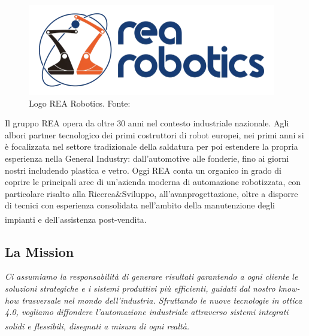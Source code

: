 \begin{figure} [ht]
    \centering
    \includegraphics[width=0.5\linewidth]{Immagini/LogoREA.png}
    \caption{Logo REA Robotics. Fonte: \cite{rearoboticsLOGO}}
    \label{fig:LogoREA.png}
\end{figure}

Il gruppo REA opera da oltre 30 anni nel contesto industriale nazionale. Agli albori partner tecnologico dei primi costruttori di robot europei, nei primi anni si è focalizzata nel settore tradizionale della saldatura per poi estendere la propria esperienza nella General Industry: dall'automotive alle fonderie, fino ai giorni nostri includendo plastica e vetro. Oggi REA conta un organico in grado di coprire le principali aree di un'azienda moderna di automazione robotizzata, con particolare risalto alla Ricerca\&Sviluppo, all'avanprogettazione, oltre a disporre di tecnici con esperienza consolidata nell'ambito della manutenzione degli impianti e dell'assistenza post-vendita.\textsuperscript{\cite{spaziowebpdf}}

\subsection{La Mission}
\textit{Ci assumiamo la responsabilità di generare risultati garantendo a ogni cliente le soluzioni strategiche e i sistemi produttivi più efficienti, guidati dal nostro know-how trasversale nel mondo dell'industria. Sfruttando le nuove tecnologie in ottica 4.0, vogliamo diffondere l'automazione industriale attraverso sistemi integrati solidi e flessibili, disegnati a misura di ogni realtà.}\textsuperscript{\cite{rearobotics}}

